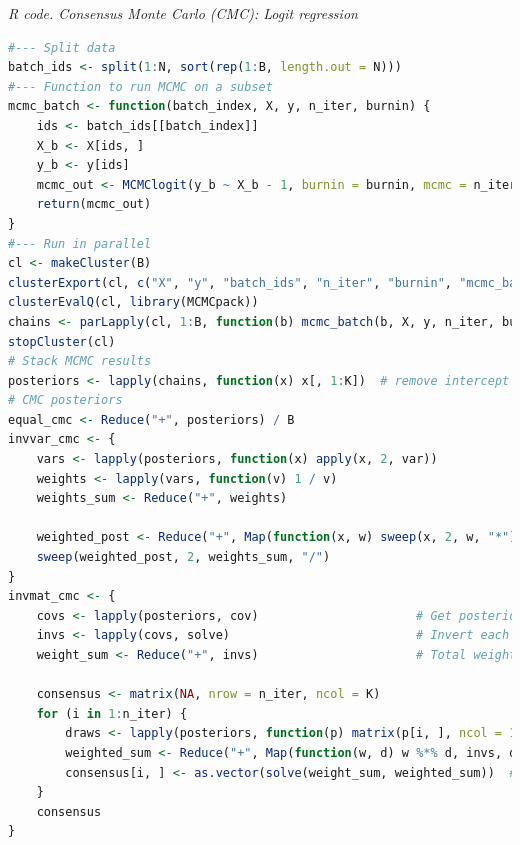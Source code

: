 \begin{tcolorbox}[enhanced,width=4.67in,center upper,
	fontupper=\large\bfseries,drop shadow southwest,sharp corners]
	\textit{R code. Consensus Monte Carlo (CMC): Logit regression}
	\begin{VF}
		\begin{lstlisting}[language=R]
#--- Split data
batch_ids <- split(1:N, sort(rep(1:B, length.out = N)))
#--- Function to run MCMC on a subset
mcmc_batch <- function(batch_index, X, y, n_iter, burnin) {
	ids <- batch_ids[[batch_index]]
	X_b <- X[ids, ]
	y_b <- y[ids]
	mcmc_out <- MCMClogit(y_b ~ X_b - 1, burnin = burnin, mcmc = n_iter, verbose = 0, b0 = 0, B0 = Prior_prec * (1/B))
	return(mcmc_out)
}
#--- Run in parallel
cl <- makeCluster(B)
clusterExport(cl, c("X", "y", "batch_ids", "n_iter", "burnin", "mcmc_batch", "Prior_prec", "B"))
clusterEvalQ(cl, library(MCMCpack))
chains <- parLapply(cl, 1:B, function(b) mcmc_batch(b, X, y, n_iter, burnin))
stopCluster(cl)
# Stack MCMC results
posteriors <- lapply(chains, function(x) x[, 1:K])  # remove intercept if added
# CMC posteriors
equal_cmc <- Reduce("+", posteriors) / B
invvar_cmc <- {
	vars <- lapply(posteriors, function(x) apply(x, 2, var))
	weights <- lapply(vars, function(v) 1 / v)
	weights_sum <- Reduce("+", weights)
	
	weighted_post <- Reduce("+", Map(function(x, w) sweep(x, 2, w, "*"), posteriors, weights))
	sweep(weighted_post, 2, weights_sum, "/")
}
invmat_cmc <- {
	covs <- lapply(posteriors, cov)                      # Get posterior covariances
	invs <- lapply(covs, solve)                          # Invert each covariance
	weight_sum <- Reduce("+", invs)                      # Total weight matrix
	
	consensus <- matrix(NA, nrow = n_iter, ncol = K)
	for (i in 1:n_iter) {
		draws <- lapply(posteriors, function(p) matrix(p[i, ], ncol = 1))  # Ensure column matrix
		weighted_sum <- Reduce("+", Map(function(w, d) w %*% d, invs, draws))  # Weighted matrix product
		consensus[i, ] <- as.vector(solve(weight_sum, weighted_sum))  # Solve system and convert to vector
	}
	consensus
}
\end{lstlisting}
	\end{VF}
\end{tcolorbox}

